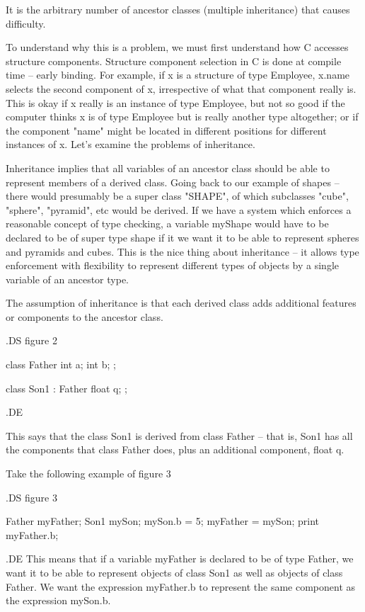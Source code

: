 It is the arbitrary number of ancestor classes (multiple inheritance)
that causes difficulty.

To understand why this is a problem, we must first
understand how C accesses structure components.  Structure component
selection in C is done at compile time -- early binding.   For example,
if x is a structure of type Employee, x.name selects the second component of
x, irrespective of what that component really is.  This is okay if x really
is an instance of type Employee, but not so good if the computer thinks
x is of type Employee but is really another type altogether; or if the
component "name" might be located in different positions for different
instances of x.  Let's examine the problems of inheritance.

Inheritance implies that all variables of an ancestor class should
be able to represent members of a derived class.  Going back to our example
of shapes --  there would presumably be a super class "SHAPE", of which
subclasses "cube", "sphere", "pyramid", etc would be derived.  If we have
a system which enforces a reasonable concept of type checking, a variable
myShape would have to be declared to be of super type shape if it we want
it to be able to represent spheres and pyramids and cubes.  This is the
nice thing about inheritance -- it allows type enforcement with flexibility
to represent different types of objects by a single variable of an ancestor
type.  

The assumption of inheritance is that each derived class adds additional
features or components to the ancestor class.  

.DS
figure 2

class Father
    {	int	a;
	int	b;
    }	;


class Son1 : Father
    {	float	q;
    }	;

.DE

This says that the class Son1 is derived from class Father -- that is, Son1
has all the components that class Father does, plus an additional component,
float q.

Take the following example of figure 3

.DS
figure 3

Father myFather;
Son1	mySon;
mySon.b = 5;
myFather = mySon;
print myFather.b;

.DE
This means that if a variable myFather is declared to be of type
Father, we want it to be able to represent objects of class Son1 as well as 
objects of class Father.  We want the expression myFather.b to represent the
same component as the expression mySon.b.

